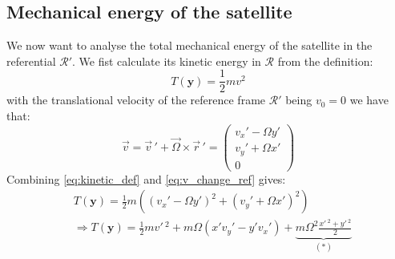 \subsection{Mechanical energy of the satellite}
We now want to analyse the total mechanical energy of the satellite in the referential $\mathcal{R}'$. We fist calculate its kinetic energy in $\mathcal{R}$ from the definition:
\begin{equation}
    T(\mathbf{y}) = \frac{1}{2}m v^2
    \label{eq:kinetic_def}
\end{equation}
with the translational velocity of the reference frame $\mathcal{R}'$ being $v_0 = 0$ we have that:
\begin{equation}
    \vec{v} = \vec{v}\,' + \vec{\Omega}\times\vec{r}\,' = \left(\begin{matrix} v_x' - \Omega y' \\ v_y' + \Omega x' \\ 0 \end{matrix}\right)
    \label{eq:v_change_ref}
\end{equation}
Combining \autoref{eq:kinetic_def} and \autoref{eq:v_change_ref} gives:
\begin{equation}
    \begin{aligned}
        & T(\mathbf{y}) = \frac{1}{2}m\left((v_x' - \Omega y')^2 + (v_y' + \Omega x')^2\right) \\
        & \Rightarrow T(\mathbf{y}) = \frac{1}{2}mv'\,^2 + m\Omega(x'v_y' - y'v_x') + \underbrace{m\Omega^2\frac{x'\,^2 + y'\,^2}{2}}_{(\ast)}
    \end{aligned}
    \label{eq:kinetic_frame_rot}
\end{equation}


